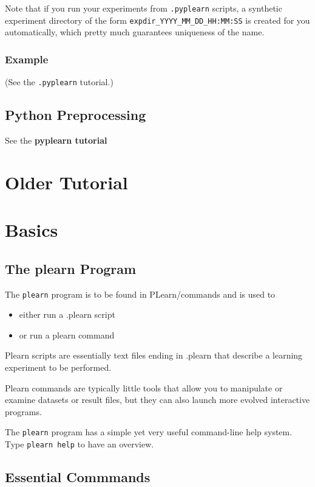 \documentclass[11pt]{book}
\begin{document}
Note that if you run your experiments from \verb|.pyplearn| scripts, a
synthetic experiment directory of the form
\verb|expdir_YYYY_MM_DD_HH:MM:SS| is created for you automatically, which
pretty much guarantees uniqueness of the name.

\subsection{Example}

(See the \verb|.pyplearn| tutorial.)


\section{Python Preprocessing}

See the {\bf pyplearn tutorial}

\chapter{Older Tutorial}
\label{oldtut}



\chapter{Basics}

\section{The plearn Program}

The {\tt plearn} program is to be found in PLearn/commands and is used to
\begin{itemize}
\item either run a .plearn script 
\item or run a plearn command
\end{itemize}

Plearn scripts are essentially text files ending in .plearn that describe
a learning experiment to be performed.

Plearn commands are typically little tools that allow you to manipulate or examine
datasets or result files, but they can also launch more evolved interactive programs.

The {\tt plearn} program has a simple yet very useful command-line help system.
Type \verb!plearn help! to have an overview.

\section{Essential Commmands}
\end{document}
